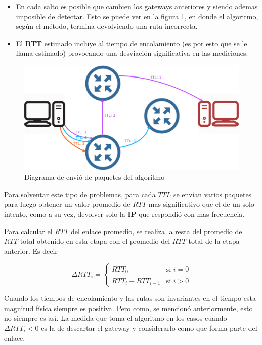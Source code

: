 \begin{itemize}
	\item En cada salto es posible que cambien los gateways anteriores y siendo
	ademas imposible de detectar. Esto se puede ver en la figura \ref{fig:diagramareal},
	en donde el algoritmo, según el método, termina devolviendo una ruta incorrecta.
	\item El \textbf{RTT} estimado incluye al tiempo de encolamiento (es por esto
	que se le llama estimado) provocando una desviación significativa en las
	mediciones.
\end{itemize}

\begin{figure}[ht]
	\begin{center}
		\includegraphics[width=0.6\columnwidth]{imagenes/diagrama_2.jpg}
		\caption{Diagrama de envió de paquetes del algoritmo}
		\label{fig:diagramareal}
	\end{center}
\end{figure}

Para solventar este tipo de problemas, para cada $TTL$ se envían varios paquetes
para luego obtener un valor promedio de $RTT$ mas significativo que el de un
solo intento, como a su vez, devolver solo la \textbf{IP} que respondió con mas
frecuencia.

Para calcular el $RTT$ del enlace promedio, se realiza la resta
del promedio del $RTT$ total obtenido en esta etapa con el promedio del $RTT$ total
de la etapa anterior.
Es decir

\begin{equation}
	\Delta RTT_{i} = \left\{
		\begin{array}{cl}
			\overline{RTT_{0}} & \mbox{si } i = 0\\
			\overline{RTT_{i}} - \overline{RTT_{i-1}} & \mbox{si } i > 0
		\end{array}
		\right.
\end{equation}

Cuando los tiempos de encolamiento y las rutas son invariantes en el tiempo
esta magnitud física siempre es positiva. Pero como, se mencionó anteriormente, esto
no siempre es así. La medida que toma el algoritmo en los casos cuando
$\Delta RTT_{i} < 0$ es la de descartar el
gateway y considerarlo como que forma parte del enlace.


